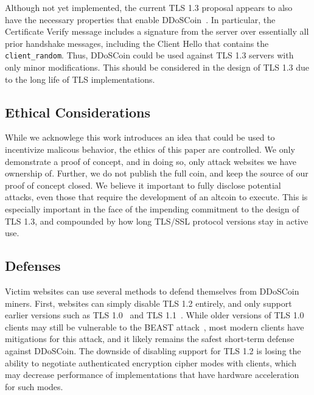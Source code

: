 
Although not yet implemented, the current TLS 1.3 proposal appears to also have the
necessary properties that enable DDoSCoin~\cite{tls-draft}. In particular, the
Certificate Verify message includes a signature from the server over essentially
all prior handshake messages, including the Client Hello that contains the
\texttt{client\_random}. Thus, DDoSCoin could be used against TLS 1.3
servers with only minor modifications. This should be considered in the design of 
TLS 1.3 due to the long life of TLS implementations.



\subsection{Ethical Considerations}
While we acknowlege this work introduces an idea that could be used to incentivize 
malicous behavior, the ethics of this paper are controlled. We only demonstrate a 
proof of concept, and in doing so, only attack websites we have ownership of.
Further, we do not publish the full coin, and keep the source of our proof of concept
closed. We believe it important to fully disclose potential attacks, even those that
require the development of an altcoin to execute. This is especially important in the
face of the impending commitment to the design of TLS 1.3, and compounded by how long 
TLS/SSL protocol versions stay in active use.


\subsection{Defenses}
\label{sec:defense}

Victim websites can use several methods to defend themselves from
DDoSCoin miners. First, websites can simply disable TLS 1.2 entirely, and only
support earlier versions such as TLS 1.0~\cite{rfc2246} and TLS
1.1~\cite{rfc4346}. While older versions of
TLS 1.0 clients may still be vulnerable to the BEAST attack~\cite{beast}, most
modern clients have mitigations for this attack, and it likely remains the
safest short-term defense against DDoSCoin. The downside of disabling support
for TLS 1.2 is losing the ability to negotiate authenticated encryption cipher
modes with clients, which may decrease performance of implementations that have
hardware acceleration for such modes.

